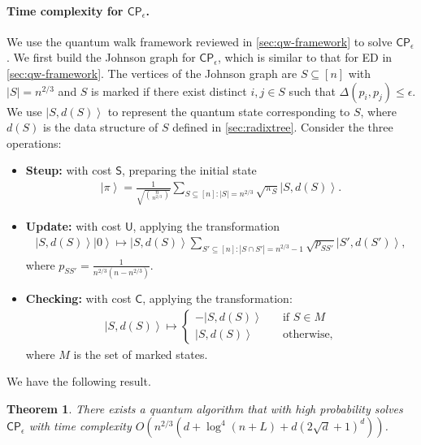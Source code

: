 \documentclass[10pt,a4paper]{article}
\newtheorem{theorem}{Theorem}
\newcommand{\ket}[1]{\left| #1 \right\rangle}
\newcommand{\eCP}{\mathsf{CP}_{\epsilon}}
\begin{document}
\paragraph{Time complexity for $\eCP$.}
We use the quantum walk framework reviewed in \cref{sec:qw-framework} to solve $\eCP$. We first build the Johnson graph for $\eCP$, which is similar to that for \textsf{ED} in \cref{sec:qw-framework}. The vertices of the Johnson graph are $S \subseteq [n]$ with $|S| = n^{2/3}$ and $S$ is marked if there exist distinct $i, j \in S$ such that $\Delta(p_i, p_j) \leq \epsilon$. 
We use $\ket{S, d(S)}$ to represent the quantum state corresponding to $S$, where $d(S)$ is the data structure of $S$ defined in \cref{sec:radixtree}. 
Consider the three operations:
\begin{itemize}
  \item \textbf{Steup:} with cost $\mathsf{S}$,
  preparing the initial state 
    \begin{align}
      \ket{\pi} = \frac{1}{\sqrt{\binom{n}{n^{2/3}}}}\sum_{S \subseteq [n]: |S|=n^{2/3}}\sqrt{\pi_S}\ket{S, d(S)}.
    \end{align}
  \item \textbf{Update:}  with cost $\mathsf{U}$, applying the transformation 
    \begin{align}
      \ket{S, d(S)}\ket{0} \mapsto \ket{S, d(S)}\sum_{S' \subseteq[n]: |S\cap S'| = n^{2/3}-1}\sqrt{p_{SS'}}\ket{S', d(S')},
    \end{align}
    where $p_{SS'} = \frac{1}{n^{2/3}(n-n^{2/3})}$.
  \item \textbf{Checking:} with cost $\mathsf{C}$, applying the transformation: 
    \begin{align}
      \ket{S, d(S)} \mapsto \begin{cases} -\ket{S, d(S)} \quad &\text{if $S\in M$} \\ \ket{S, d(S)} \quad &\text{otherwise,}\end{cases}
    \end{align}
    where $M$ is the set of marked states.
\end{itemize}

We have the following result.
\begin{theorem}
  \label{thm:ecp1}
  There exists a quantum algorithm that with high probability solves $\eCP$ with time complexity $O(n^{2/3}(d+\log^4(n+L) + d(2\sqrt{d}+1)^d))$.
\end{theorem}
\end{document}

